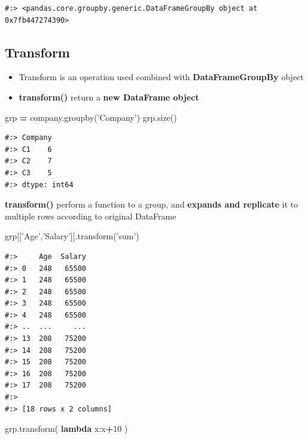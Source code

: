 \documentclass[
]{book}
\newenvironment{Shaded}{\begin{snugshade}}{\end{snugshade}}
\newcommand{\DecValTok}[1]{\textcolor[rgb]{0.06,0.06,0.06}{#1}}
\newcommand{\KeywordTok}[1]{\textcolor[rgb]{0.27,0.27,0.27}{\textbf{#1}}}
\newcommand{\NormalTok}[1]{#1}
\newcommand{\OperatorTok}[1]{\textcolor[rgb]{0.43,0.43,0.43}{\textbf{#1}}}
\newcommand{\StringTok}[1]{\textcolor[rgb]{0.5,0.5,0.5}{#1}}
\providecommand{\tightlist}{%
  \setlength{\itemsep}{0pt}\setlength{\parskip}{0pt}}
\begin{document}
\begin{verbatim}
#:> <pandas.core.groupby.generic.DataFrameGroupBy object at 0x7fb447274390>
\end{verbatim}

\hypertarget{transform}{%
\subsection{Transform}\label{transform}}

\begin{itemize}
\tightlist
\item
  Transform is an operation used combined with \textbf{DataFrameGroupBy} object\\
\item
  \textbf{transform()} return a \textbf{new DataFrame object}
\end{itemize}

\begin{Shaded}
\begin{Highlighting}[]
\NormalTok{grp }\OperatorTok{=}\NormalTok{ company.groupby(}\StringTok{'Company'}\NormalTok{)}
\NormalTok{grp.size()}
\end{Highlighting}
\end{Shaded}

\begin{verbatim}
#:> Company
#:> C1    6
#:> C2    7
#:> C3    5
#:> dtype: int64
\end{verbatim}

\textbf{transform()} perform a function to a group, and \textbf{expands and replicate} it to multiple rows according to original DataFrame

\begin{Shaded}
\begin{Highlighting}[]
\NormalTok{grp[[}\StringTok{'Age'}\NormalTok{,}\StringTok{'Salary'}\NormalTok{]].transform(}\StringTok{'sum'}\NormalTok{)}
\end{Highlighting}
\end{Shaded}

\begin{verbatim}
#:>     Age  Salary
#:> 0   248   65500
#:> 1   248   65500
#:> 2   248   65500
#:> 3   248   65500
#:> 4   248   65500
#:> ..  ...     ...
#:> 13  208   75200
#:> 14  208   75200
#:> 15  208   75200
#:> 16  208   75200
#:> 17  208   75200
#:> 
#:> [18 rows x 2 columns]
\end{verbatim}

\begin{Shaded}
\begin{Highlighting}[]
\NormalTok{grp.transform( }\KeywordTok{lambda}\NormalTok{ x:x}\OperatorTok{+}\DecValTok{10}\NormalTok{ )}
\end{Highlighting}
\end{Shaded}
\end{document}
